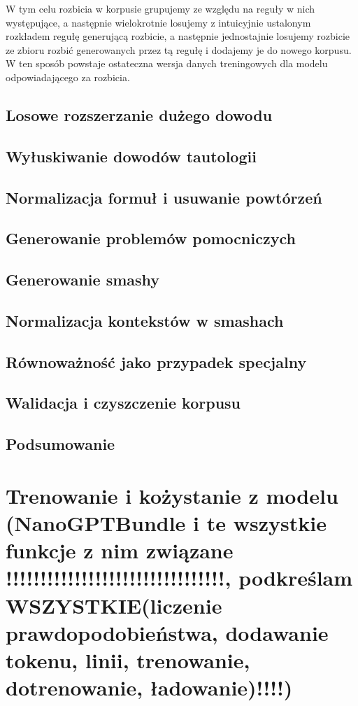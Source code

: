 \documentclass[shortabstract]{iithesis}
\theoremstyle{definition}
\theoremstyle{remark}
\theoremstyle{plain}
\begin{document}
W tym celu rozbicia w korpusie grupujemy ze względu na reguły w nich występujące, a następnie wielokrotnie losujemy z intuicyjnie 
ustalonym rozkładem regułę generującą rozbicie, a następnie jednostajnie losujemy rozbicie ze zbioru rozbić generowanych przez
tą regułę i dodajemy je do nowego korpusu. W ten sposób powstaje ostateczna wersja danych treningowych dla modelu odpowiadającego za rozbicia.

\section{Losowe rozszerzanie dużego dowodu}

\section{Wyłuskiwanie dowodów tautologii}

\section{Normalizacja formuł i usuwanie powtórzeń}

\section{Generowanie problemów pomocniczych}

\section{Generowanie smashy}

\section{Normalizacja kontekstów w smashach}

\section{Równoważność jako przypadek specjalny}

\section{Walidacja i czyszczenie korpusu}

\section{Podsumowanie}

\chapter{Trenowanie i kożystanie z modelu (NanoGPTBundle i te wszystkie funkcje z nim związane !!!!!!!!!!!!!!!!!!!!!!!!!!!!!!!!, podkreślam WSZYSTKIE(liczenie prawdopodobieństwa, dodawanie tokenu, linii, trenowanie, dotrenowanie, ładowanie)!!!!)}




\end{document}
